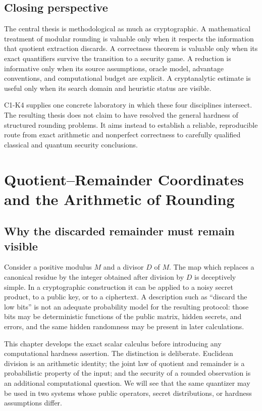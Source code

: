 \documentclass[
  11pt,
  a4paper,
  oneside]{report}
\begin{document}
\section{Closing perspective}\label{closing-perspective}

The central thesis is methodological as much as cryptographic. A
mathematical treatment of modular rounding is valuable only when it
respects the information that quotient extraction discards. A
correctness theorem is valuable only when its exact quantifiers survive
the transition to a security game. A reduction is informative only when
its source assumptions, oracle model, advantage conventions, and
computational budget are explicit. A cryptanalytic estimate is useful
only when its search domain and heuristic status are visible.

C1-K4 supplies one concrete laboratory in which these four disciplines
intersect. The resulting thesis does not claim to have resolved the
general hardness of structured rounding problems. It aims instead to
establish a reliable, reproducible route from exact arithmetic and
nonperfect correctness to carefully qualified classical and quantum
security conclusions.

\chapter{Quotient--Remainder Coordinates and the Arithmetic of
Rounding}\label{quotientremainder-coordinates-and-the-arithmetic-of-rounding}

\section{Why the discarded remainder must remain
visible}\label{why-the-discarded-remainder-must-remain-visible}

Consider a positive modulus \(M\) and a divisor \(D\) of \(M\). The map
which replaces a canonical residue by the integer obtained after
division by \(D\) is deceptively simple. In a cryptographic construction
it can be applied to a noisy secret product, to a public key, or to a
ciphertext. A description such as ``discard the low bits'' is not an
adequate probability model for the resulting protocol: those bits may be
deterministic functions of the public matrix, hidden secrets, and
errors, and the same hidden randomness may be present in later
calculations.

This chapter develops the exact scalar calculus before introducing any
computational hardness assertion. The distinction is deliberate.
Euclidean division is an arithmetic identity; the joint law of quotient
and remainder is a probabilistic property of the input; and the security
of a rounded observation is an additional computational question. We
will see that the same quantizer may be used in two systems whose public
operators, secret distributions, or hardness assumptions differ.
\end{document}
